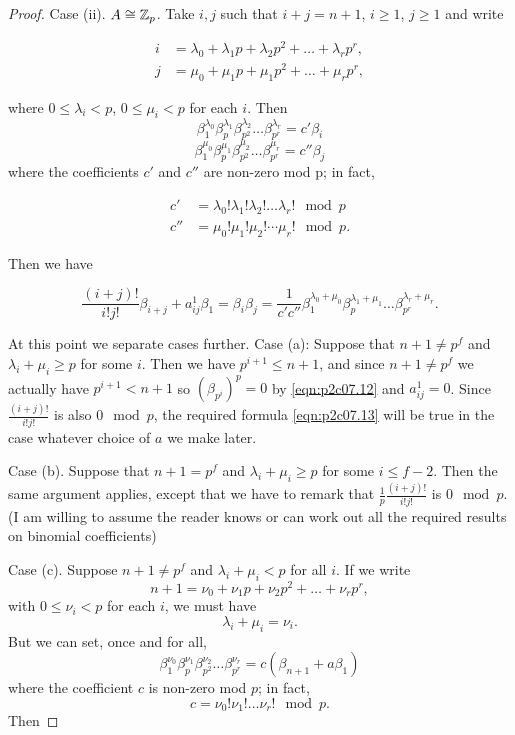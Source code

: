 \documentclass[../main]{subfiles}
\begin{document}
\begin{proof}
Case (ii). $A \cong \mathbb{Z}_p$. Take $i, j$ such that $i + j = n + 1$, $i \ge 1$, $j \ge 1$ and write 

\begin{align*}
i & = \lambda_0 + \lambda_1 p + \lambda_2 p^2 + \ldots + \lambda_r p^r, \\ j & = \mu_0 + \mu_1 p + \mu_1 p^2 + \ldots + \mu_r p^r,
\end{align*}

where $0 \le \lambda_i < p$, $0 \le \mu_i < p$ for each $i$. Then $$\beta_1^{\lambda_0} \beta_p^{\lambda_1} \beta_{p^2}^{\lambda_2} \ldots \beta_{p^r}^{\lambda_r} = c'\beta_i$$ $$\beta_1^{\mu_0} \beta_p^{\mu_1} \beta_{p^2}^{\mu_2} \ldots \beta_{p^r}^{\mu_r} = c''\beta_j$$ where the coefficients $c'$ and $c''$ are non-zero mod p; in fact,

\begin{align*}
c' & = \lambda_0! \lambda_1! \lambda_2! \ldots \lambda_r! \mod p \\ c'' & = \mu_0! \mu_1! \mu_2! \cdots \mu_r! \mod p.
\end{align*}

Then we have 

$$\frac {(i + j)!} {i! j!} \beta_{i + j} + a_{ij}^1 \beta_1 = \beta_i \beta_j = \frac 1 {c' c''} \beta_1^{\lambda_0 + \mu_0} \beta_p^{\lambda_1 + \mu_1} \ldots \beta_{p^r}^{\lambda_r + \mu_r}.$$ 

At this point we separate cases further.
Case (a): Suppose that $n + 1 \ne p^f$ and $\lambda_i + \mu_i \ge p$ for some $i$. Then we have $p^{i + 1} \le n + 1$, and since $n + 1 \ne p^f$ we actually have $p^{i + 1} < n + 1$ so $\left(\beta_{p^i}\right)^p = 0$ by \eqref{eqn:p2c07.12} and $a_{ij}^1 = 0$. Since $\displaystyle \frac {(i + j)!} {i! j!}$ is also $0 \mod p$, the required formula \eqref{eqn:p2c07.13} will be true in the case whatever choice of $a$ we make later.

Case (b). Suppose that $n + 1 = p^f$ and $\lambda_i + \mu_i \ge p$ for some $i \le f - 2$. Then the same argument applies, except that we have to remark that $\displaystyle \frac 1 p \frac {(i + j)!} {i! j!}$ is $0 \mod p$. (I am willing to assume the reader knows or can work out all the required results on binomial coefficients)

Case (c). Suppose $n + 1 \ne p^f$ and $\lambda_i + \mu_i < p$ for all $i$. If we write $$n + 1 = \nu_0 + \nu_1 p + \nu_2 p^2 + \ldots + \nu_r p^r,$$ with $0 \le \nu_i < p$ for each $i$, we must have $$\lambda_i + \mu_i = \nu_i.$$ But we can set, once and for all, $$\beta_1^{\nu_0} \beta_p^{\nu_1} \beta_{p^2}^{\nu_2} \ldots \beta_{p^r}^{\nu_r} = c(\beta_{n + 1} + a \beta_1)$$ where the coefficient $c$ is non-zero mod $p$; in fact, $$c = \nu_0! \nu_1! \ldots \nu_r! \mod p.$$ Then


\end{proof}
\end{document}
